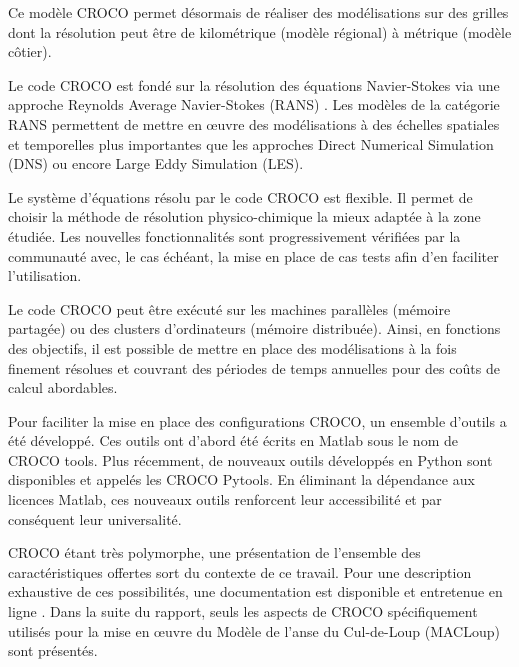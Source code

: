 \documentclass[10pt,a4paper,titlepage]{article}
\begin{document}

    Ce modèle CROCO permet désormais de réaliser des modélisations sur des grilles dont la résolution peut être de kilométrique (modèle régional) à métrique (modèle côtier).

    Le code CROCO est fondé sur la résolution des équations Navier-Stokes via une approche Reynolds Average Navier-Stokes (RANS) \parencite{RANS_def}.
Les modèles de la catégorie RANS permettent de mettre en \oe{}uvre des modélisations à des échelles spatiales et temporelles plus importantes que les approches Direct Numerical Simulation (DNS) ou encore Large Eddy Simulation (LES).

Le système d'équations résolu par le code CROCO est flexible.
Il permet de choisir la méthode de résolution physico-chimique la mieux adaptée à la zone étudiée.
Les nouvelles fonctionnalités sont progressivement vérifiées par la communauté avec, le cas échéant, la mise en place de cas tests afin d'en faciliter l'utilisation.


Le code CROCO peut être exécuté sur les machines parallèles (mémoire partagée) ou des clusters d'ordinateurs (mémoire distribuée).
Ainsi, en fonctions des objectifs, il est possible de mettre en place des modélisations à la fois finement résolues et couvrant des périodes de temps annuelles pour des coûts de calcul abordables.

Pour faciliter la mise en place des configurations CROCO, un ensemble d'outils a été développé.
Ces outils ont d'abord été écrits en Matlab sous le nom de CROCO tools.
Plus récemment, de nouveaux outils développés en Python sont disponibles et appelés les CROCO Pytools.
En éliminant la dépendance aux licences Matlab, ces nouveaux outils renforcent leur accessibilité et par conséquent leur universalité.

CROCO étant très polymorphe, une présentation de l'ensemble des caractéristiques offertes sort du contexte de ce travail.
Pour une description exhaustive de ces possibilités, une documentation est disponible et entretenue en ligne \parencite{documentation_croco}.
Dans la suite du rapport, seuls les aspects de CROCO spécifiquement utilisés pour la mise en \oe{}uvre du Modèle de l'anse du Cul-de-Loup (MACLoup) sont présentés.
\end{document}
